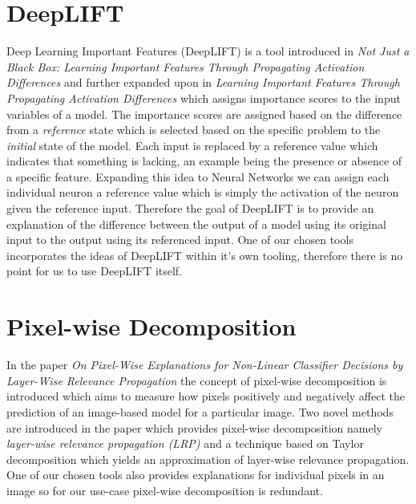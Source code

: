 \section{DeepLIFT}
Deep Learning Important Features (DeepLIFT) is a tool introduced in \emph{Not Just a Black Box: Learning Important Features Through Propagating Activation Differences} \cite{DBLP:journals/corr/ShrikumarGSK16} and further expanded upon in \emph{Learning Important Features Through Propagating Activation Differences} \cite{DBLP:journals/corr/ShrikumarGK17} which assigns importance scores to the input variables of a model. The importance scores are assigned based on the difference from a \emph{reference} state which is selected based on the specific problem to the \emph{initial} state of the model. Each input is replaced by a reference value which indicates that something is lacking, an example being the presence or absence of a specific feature. Expanding this idea to Neural Networks we can assign each individual neuron a reference value which is simply the activation of the neuron given the reference input. Therefore the goal of DeepLIFT is to provide an explanation of the difference between the output of a model using its original input to the output using its referenced input. One of our  chosen tools incorporates the ideas of DeepLIFT within it's own tooling, therefore there is no point for us to use DeepLIFT itself.
\section{Pixel-wise Decomposition}
In the paper \emph{On Pixel-Wise Explanations for Non-Linear Classifier Decisions by Layer-Wise Relevance Propagation} \cite{Bach2015OnPropagation} the concept of pixel-wise decomposition is introduced which aims to measure how pixels positively and negatively affect the prediction of an image-based model for a particular image. Two novel methods are introduced in the paper which provides pixel-wise decomposition namely \emph{layer-wise relevance propagation (LRP)} and a technique based on Taylor decomposition \cite{DBLP:journals/corr/MontavonBBSM15} which yields an approximation of layer-wise relevance propagation. One of our chosen tools also provides explanations for individual pixels in an image so  for our use-case pixel-wise decomposition is redundant.

